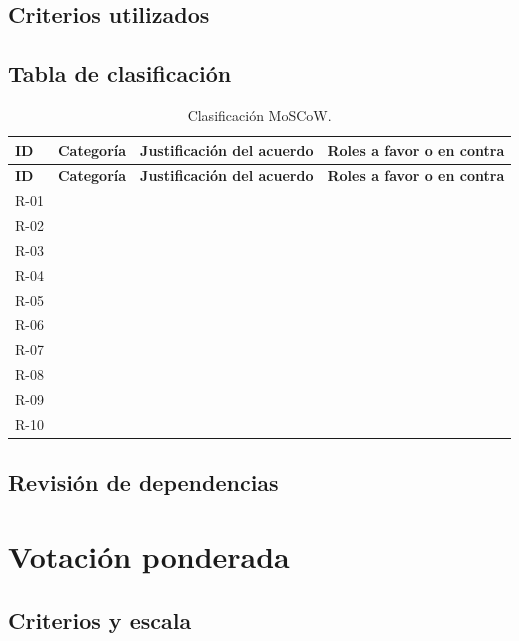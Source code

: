 \documentclass[11pt,a4paper]{article}
\begin{document}
\subsection{Criterios utilizados}

\subsection{Tabla de clasificación}

\begin{longtable}{
    |L{1.1cm}
    |L{2cm}
    |L{6.8cm}
    |L{3.4cm}|
}
\caption{Clasificación MoSCoW.}
\label{tab:moscow}\\
\hline
{}
\textbf{ID} &
\textbf{Categoría} &
\textbf{Justificación del acuerdo} &
\textbf{Roles a favor o en contra} \\
\hline
\endfirsthead

\hline
{}
\textbf{ID} &
\textbf{Categoría} &
\textbf{Justificación del acuerdo} &
\textbf{Roles a favor o en contra} \\
\hline
\endhead

R-01 & & & \\ \hline
R-02 & & & \\ \hline
R-03 & & & \\ \hline
R-04 & & & \\ \hline
R-05 & & & \\ \hline
R-06 & & & \\ \hline
R-07 & & & \\ \hline
R-08 & & & \\ \hline
R-09 & & & \\ \hline
R-10 & & & \\ \hline

\end{longtable}

\subsection{Revisión de dependencias}

\section{Votación ponderada}

\subsection{Criterios y escala}
\end{document}
